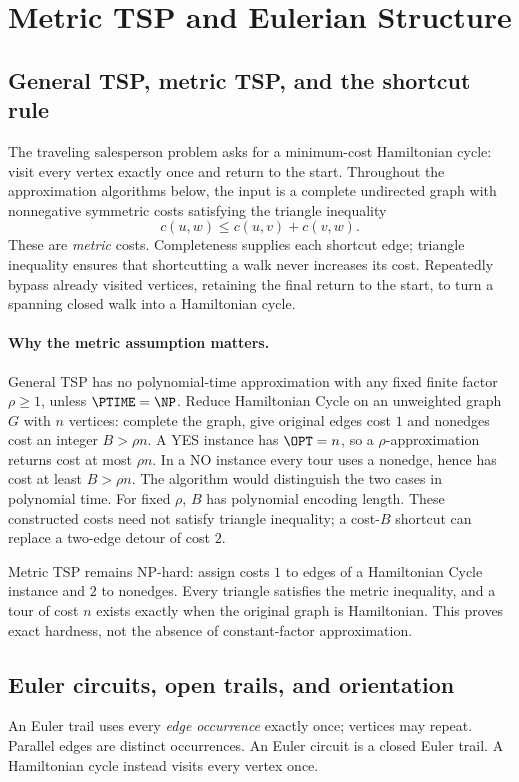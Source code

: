 \section{Metric TSP and Eulerian Structure}\label{tsp:main}

\subsection{General TSP, metric TSP, and the shortcut rule}
The traveling salesperson problem asks for a minimum-cost Hamiltonian
cycle: visit every vertex exactly once and return to the start.  Throughout
the approximation algorithms below, the input is a complete undirected
graph with nonnegative symmetric costs satisfying the triangle inequality
\[
c(u,w)\le c(u,v)+c(v,w).
\]
These are \emph{metric} costs.  Completeness supplies each shortcut edge;
triangle inequality ensures that shortcutting a walk never increases its
cost.  Repeatedly bypass already visited vertices, retaining the final
return to the start, to turn a spanning closed walk into a Hamiltonian cycle.

\paragraph{Why the metric assumption matters.}
General TSP has no polynomial-time approximation with any fixed finite
factor $\rho\ge1$, unless $\PTIME=\NP$.  Reduce Hamiltonian Cycle on an
unweighted graph $G$ with $n$ vertices: complete the graph, give original
edges cost $1$ and nonedges cost an integer $B>\rho n$.  A YES instance has
$\OPT=n$, so a $\rho$-approximation returns cost at most $\rho n$.  In a NO
instance every tour uses a nonedge, hence has cost at least $B>\rho n$.
The algorithm would distinguish the two cases in polynomial time.  For
fixed $\rho$, $B$ has polynomial encoding length.  These constructed costs
need not satisfy triangle inequality; a cost-$B$ shortcut can replace a
two-edge detour of cost $2$.

Metric TSP remains NP-hard: assign costs $1$ to edges of a Hamiltonian Cycle
instance and $2$ to nonedges.  Every triangle satisfies the metric inequality,
and a tour of cost $n$ exists exactly when the original graph is Hamiltonian.
This proves exact hardness, not the absence of constant-factor approximation.

\subsection{Euler circuits, open trails, and orientation}\label{tsp:euler}
An Euler trail uses every \emph{edge occurrence} exactly once; vertices may
repeat.  Parallel edges are distinct occurrences.  An Euler circuit is a
closed Euler trail.  A Hamiltonian cycle instead visits every vertex once.

